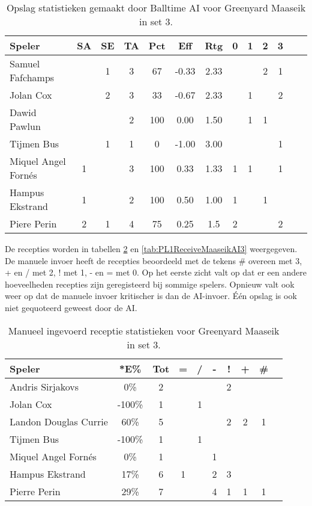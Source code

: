 \begin{table}[ht!]
  \centering
  \scriptsize
  \begin{tabular}{|l|c|c|c|c|c|c|c|c|c|c|c|c|} \hline
    \textbf{Speler} & SA & SE & TA & Pct & Eff & Rtg & 0 & 1 & 2 & 3  \\ \hline
    Samuel Fafchamps &  & 1 & 3 & 67 & -0.33 & 2.33 &   &   & 2 & 1 \\
    Jolan Cox &  & 2 & 3 & 33 & -0.67 & 2.33 &   & 1 &   & 2 \\
    Dawid Pawlun &  &  & 2 & 100 & 0.00 & 1.50 &   & 1 & 1 &  \\
    Tijmen Bus &  & 1 & 1 & 0 & -1.00 & 3.00 &   & &   &  1 \\
    Miquel Angel Fornés & 1 &  & 3 & 100 & 0.33 & 1.33 & 1 & 1 &   & 1 \\
    Hampus Ekstrand & 1 &  & 2 & 100 & 0.50 & 1.00 & 1 &   & 1 &  \\
    Piere Perin & 2 & 1 & 4 & 75 & 0.25 & 1.5 & 2 &   &   & 2 \\ \hline
  \end{tabular}
  \caption[Opslagstatistieken gemaakt door Balltime AI voor Greenyard Maaseik in set 3]{\label{tab:PL1ServeMaaseikAI3}Opslag statistieken gemaakt door Balltime AI voor Greenyard Maaseik in set 3.}
\end{table}

De recepties worden in tabellen \ref{tab:PL1ReceiveMaaseikMan3} en \ref{tab:PL1ReceiveMaaseikAI3} weergegeven. De manuele invoer heeft de recepties beoordeeld met de tekens \# overeen met 3, + en / met 2, ! met 1, - en = met 0. Op het eerste zicht valt op dat er een andere hoeveelheden recepties zijn geregisteerd bij sommige spelers. Opnieuw valt ook weer op dat de manuele invoer kritischer is dan de AI-invoer. Één opslag is ook niet gequoteerd geweest door de AI.

\begin{table}[ht!]
  \centering
  \scriptsize
  \begin{tabular}{|l|c|c|c|c|c|c|c|c|c|}
    \hline
    \textbf{Speler}& *E\% & Tot & = & / & - & ! & + & \#\\ \hline
    Andris Sirjakovs & 0\% & 2 &  &  &  & 2 &  &  \\ 
    Jolan Cox & -100\% & 1 &  & 1 &  &  &  &  \\
    Landon Douglas Currie & 60\% & 5 &  &  &  & 2 & 2 & 1 \\
    Tijmen Bus & -100\% & 1 &  & 1 &  &  &  &  \\ 
    Miquel Angel Fornés & 0\% & 1 &  &  & 1 &  &  &  \\ 
    Hampus Ekstrand & 17\% & 6 & 1 &  & 2 & 3 &  &  \\ 
    Pierre Perin & 29\% & 7 &  &  & 4 & 1 & 1 & 1 \\ \hline
  \end{tabular}
  \caption[Manueel ingevoerde receptiestatistieken voor Greenyard Maaseik in set 3]{\label{tab:PL1ReceiveMaaseikMan3}Manueel ingevoerd receptie statistieken voor Greenyard Maaseik in set 3.}
\end{table}

